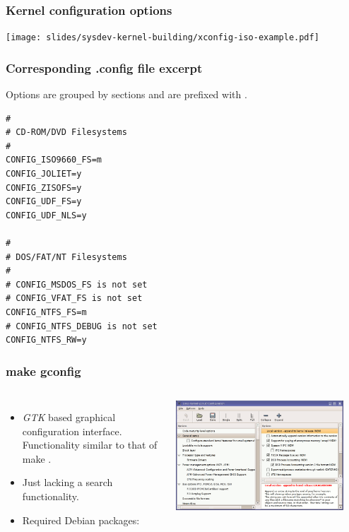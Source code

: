 \begin{frame}
\frametitle{Kernel configuration options}
  \begin{center}
    \texttt{[image: slides/sysdev-kernel-building/xconfig-iso-example.pdf]}
  \end{center}
\end{frame}

\begin{frame}[fragile]
  \frametitle{Corresponding .config file excerpt}
  Options are grouped by sections and are prefixed with
  .
\small
\begin{verbatim}
#
# CD-ROM/DVD Filesystems
#
CONFIG_ISO9660_FS=m
CONFIG_JOLIET=y
CONFIG_ZISOFS=y
CONFIG_UDF_FS=y
CONFIG_UDF_NLS=y

#
# DOS/FAT/NT Filesystems
#
# CONFIG_MSDOS_FS is not set
# CONFIG_VFAT_FS is not set
CONFIG_NTFS_FS=m
# CONFIG_NTFS_DEBUG is not set
CONFIG_NTFS_RW=y
\end{verbatim}
\end{frame}

\begin{frame}
  \frametitle{make gconfig}
  \begin{columns}
    \begin{itemize}
      \item {\em GTK} based graphical configuration interface. Functionality
            similar to that of make .
      \item Just lacking a search functionality.
      \item Required Debian packages: 
    \end{itemize}
    \includegraphics[width=0.9\textwidth]{slides/sysdev-kernel-building/gconfig-screenshot.png}
  \end{columns}
\end{frame}

